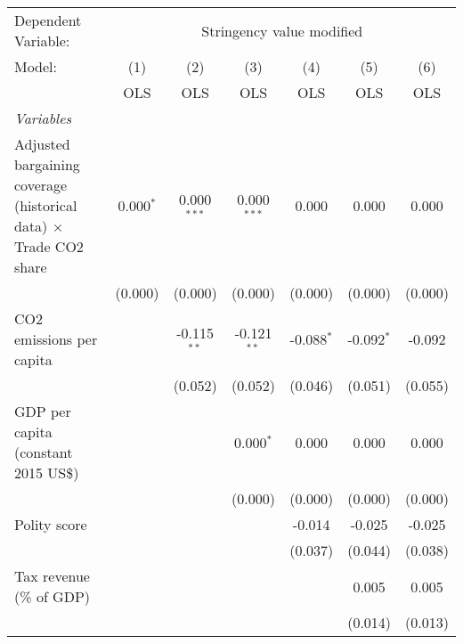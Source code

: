 
\begingroup
\centering
\begin{tabular}{lcccccc}
   \toprule
   Dependent Variable: & \multicolumn{6}{c}{Stringency value modified}\\
   Model:                                                                   & (1)         & (2)           & (3)           & (4)          & (5)          & (6)\\  
                                                                            &  OLS        & OLS           & OLS           & OLS          & OLS          & OLS\\  
   \midrule
   \emph{Variables}\\
   Adjusted bargaining coverage (historical data) $\times$ Trade CO2 share  & 0.000$^{*}$ & 0.000$^{***}$ & 0.000$^{***}$ & 0.000        & 0.000        & 0.000\\   
                                                                            & (0.000)     & (0.000)       & (0.000)       & (0.000)      & (0.000)      & (0.000)\\   
   CO2 emissions per capita                                                 &             & -0.115$^{**}$ & -0.121$^{**}$ & -0.088$^{*}$ & -0.092$^{*}$ & -0.092\\   
                                                                            &             & (0.052)       & (0.052)       & (0.046)      & (0.051)      & (0.055)\\   
   GDP per capita (constant 2015 US\$)                                      &             &               & 0.000$^{*}$   & 0.000        & 0.000        & 0.000\\   
                                                                            &             &               & (0.000)       & (0.000)      & (0.000)      & (0.000)\\   
   Polity score                                                             &             &               &               & -0.014       & -0.025       & -0.025\\   
                                                                            &             &               &               & (0.037)      & (0.044)      & (0.038)\\   
   Tax revenue (\% of GDP)                                                  &             &               &               &              & 0.005        & 0.005\\   
                                                                            &             &               &               &              & (0.014)      & (0.013)\\   

\end{tabular}
